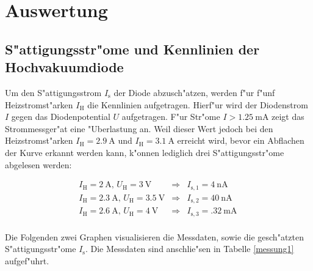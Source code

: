 \section{Auswertung}
	\label{sec:auswertung}

	\subsection{S"attigungsstr"ome und Kennlinien der Hochvakuumdiode}
		Um den S"attigungsstrom $I_\mathrm{s}$ der Diode abzusch"atzen, werden f"ur f"unf Heizstromst"arken $I_\mathrm{H}$ die Kennlinien aufgetragen.
		Hierf"ur wird der Diodenstrom $I$ gegen das Diodenpotential $U$ aufgetragen.
		F"ur Str"ome $I > \SI{1.25}{\milli \ampere}$ zeigt das Strommessger"at eine "Uberlastung an.
		Weil dieser Wert jedoch bei den Heizstromst"arken $I_\mathrm{H} = \SI{2.9}{\ampere}$ und $I_\mathrm{H} = \SI{3.1}{\ampere}$ erreicht wird, bevor ein Abflachen der Kurve erkannt werden kann, k"onnen lediglich drei S"attigungsstr"ome abgelesen werden:

		\begin{eqnarray*}
			I_\mathrm{H} = \SI{2}{\ampere}, \, U_\mathrm{H} = \SI{3}{\volt} & \Rightarrow & I_{\mathrm{s},1} = \SI{4}{\nano \ampere}\, \\
			I_\mathrm{H} = \SI{2.3}{\ampere}, \, U_\mathrm{H} = \SI{3.5}{\volt} & \Rightarrow & I_{\mathrm{s},2} = \SI{40}{\nano \ampere}\, \\
			I_\mathrm{H} = \SI{2.6}{\ampere}, \, U_\mathrm{H} = \SI{4}{\volt} & \Rightarrow & I_{\mathrm{s},3} = \SI{.32}{\milli \ampere}\, \\
		\end{eqnarray*}

		Die Folgenden zwei Graphen visualisieren die Messdaten, sowie die gesch"atzten S"attigungsstr"ome $I_\mathrm{s}$.
		Die Messdaten sind anschlie"sen in Tabelle \ref{messung1} aufgef"uhrt.

		\clearpage


